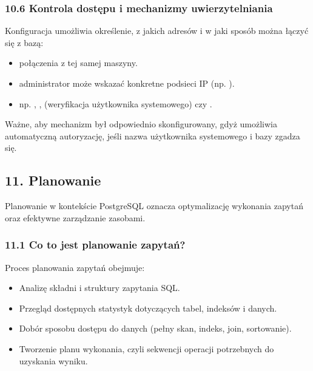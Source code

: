 \documentclass[a4paper,11pt,openany,english]{sphinxmanual}
\begin{document}
\subsubsection{10.6 Kontrola dostępu i mechanizmy uwierzytelniania}
\label{\detokenize{rozdzial2/Konfiguracja_baz_danych/Konfiguracja_baz_danych:kontrola-dostepu-i-mechanizmy-uwierzytelniania}}
\sphinxAtStartPar
Konfiguracja umożliwia określenie, z jakich adresów i w jaki sposób można łączyć się z bazą:
\begin{itemize}
\item {} 
\sphinxAtStartPar
{} \textendash{} połączenia z tej samej maszyny.

\item {} 
\sphinxAtStartPar
{} \textendash{} administrator może wskazać konkretne podsieci IP (np. ).

\item {} 
\sphinxAtStartPar
{} \textendash{} np. , ,  (weryfikacja użytkownika systemowego) czy .

\end{itemize}

\sphinxAtStartPar
Ważne, aby mechanizm  był odpowiednio skonfigurowany, gdyż umożliwia automatyczną autoryzację, jeśli nazwa użytkownika systemowego i bazy zgadza się.


\subsection{11. Planowanie}
\label{\detokenize{rozdzial2/Konfiguracja_baz_danych/Konfiguracja_baz_danych:planowanie}}
\sphinxAtStartPar
Planowanie w kontekście PostgreSQL oznacza optymalizację wykonania zapytań oraz efektywne zarządzanie zasobami.


\subsubsection{11.1 Co to jest planowanie zapytań?}
\label{\detokenize{rozdzial2/Konfiguracja_baz_danych/Konfiguracja_baz_danych:co-to-jest-planowanie-zapytan}}
\sphinxAtStartPar
Proces planowania zapytań obejmuje:
\begin{itemize}
\item {} 
\sphinxAtStartPar
Analizę składni i struktury zapytania SQL.

\item {} 
\sphinxAtStartPar
Przegląd dostępnych statystyk dotyczących tabel, indeksów i danych.

\item {} 
\sphinxAtStartPar
Dobór sposobu dostępu do danych (pełny skan, indeks, join, sortowanie).

\item {} 
\sphinxAtStartPar
Tworzenie planu wykonania, czyli sekwencji operacji potrzebnych do uzyskania wyniku.

\end{itemize}
\end{document}
